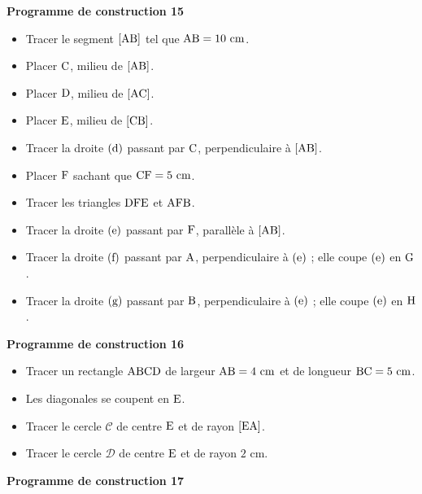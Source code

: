 \documentclass{article}
\begin{document}
\noindent\textbf{Programme de construction 15}\par\smallskip\noindent
\begin{itemize}
    \item Tracer le segment $[\text{AB}]$ tel que
    $\text{AB}=10\text{ cm}$.
    \item Placer $\text{C}$, milieu de $[\text{AB}]$.
    \item Placer $\text{D}$, milieu de $[\text{AC}]$.
    \item Placer $\text{E}$, milieu de $[\text{CB}]$.
    \item Tracer la droite $(\text{d})$ passant par
    $\text{C}$, perpendiculaire à $[\text{AB}]$.
    \item Placer $\text{F}$ sachant que $\text{CF}=5\text{ cm}$.
    \item Tracer les triangles $\text{DFE}$ et $\text{AFB}$.
    \item Tracer la droite $(\text{e})$ passant par
    $\text{F}$, parallèle à $[\text{AB}]$.
    \item Tracer la droite $(\text{f})$ passant par
    $\text{A}$, perpendiculaire à $(\text{e})$ ; elle coupe
    $(\text{e})$ en $\text{G}$.
    \item Tracer la droite $(\text{g})$ passant par
    $\text{B}$, perpendiculaire à $(\text{e})$ ; elle coupe
    $(\text{e})$ en $\text{H}$.
\end{itemize}
\noindent\textbf{Programme de construction 16}\par\smallskip\noindent
\begin{itemize}
    \item Tracer un rectangle $\text{ABCD}$ de largeur
    $\text{AB}=4\text{ cm}$ et de longueur $\text{BC}=5\text{ cm}$.
    \item Les diagonales se coupent en $\text{E}$.
    \item Tracer le cercle $\mathcal{C}$ de centre $\text{E}$ et de
    rayon $[\text{EA}]$.
    \item Tracer le cercle $\mathcal{D}$ de centre $\text{E}$ et de
    rayon $2\text{ cm}$.
\end{itemize}
\noindent\textbf{Programme de construction 17}\par\smallskip\noindent
\end{document}
